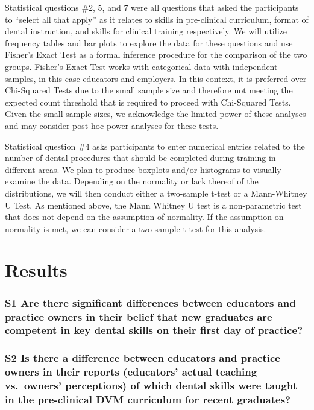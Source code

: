 \documentclass[
  11pt,
  letterpaper,
  DIV=11,
  numbers=noendperiod]{scrartcl}
\begin{document}
Statistical questions \#2, 5, and 7 were all questions that asked the
participants to ``select all that apply'' as it relates to skills in
pre-clinical curriculum, format of dental instruction, and skills for
clinical training respectively. We will utilize frequency tables and bar
plots to explore the data for these questions and use Fisher's Exact
Test as a formal inference procedure for the comparison of the two
groups. Fisher's Exact Test works with categorical data with independent
samples, in this case educators and employers. In this context, it is
preferred over Chi-Squared Tests due to the small sample size and
therefore not meeting the expected count threshold that is required to
proceed with Chi-Squared Tests. Given the small sample sizes, we
acknowledge the limited power of these analyses and may consider post
hoc power analyses for these tests.

Statistical question \#4 asks participants to enter numerical entries
related to the number of dental procedures that should be completed
during training in different areas. We plan to produce boxplots and/or
histograms to visually examine the data. Depending on the normality or
lack thereof of the distributions, we will then conduct either a
two-sample t-test or a Mann-Whitney U Test. As mentioned above, the Mann
Whitney U test is a non-parametric test that does not depend on the
assumption of normality. If the assumption on normality is met, we can
consider a two-sample t test for this analysis.

\section{Results}\label{results}

\subsubsection{S1 Are there significant differences between educators
and practice owners in their belief that new graduates are competent in
key dental skills on their first day of
practice?}\label{s1-are-there-significant-differences-between-educators-and-practice-owners-in-their-belief-that-new-graduates-are-competent-in-key-dental-skills-on-their-first-day-of-practice}

\subsubsection{S2 Is there a difference between educators and practice
owners in their reports (educators' actual teaching vs.~owners'
perceptions) of which dental skills were taught in the pre-clinical DVM
curriculum for recent
graduates?}\label{s2-is-there-a-difference-between-educators-and-practice-owners-in-their-reports-educators-actual-teaching-vs.-owners-perceptions-of-which-dental-skills-were-taught-in-the-pre-clinical-dvm-curriculum-for-recent-graduates}
\end{document}
